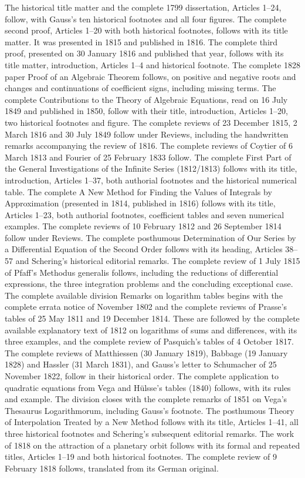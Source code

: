 The historical title matter and the complete 1799 dissertation, Articles 1–24, follow, with Gauss’s ten historical footnotes and all four figures. The complete second proof, Articles 1–20 with both historical footnotes, follows with its title matter. It was presented in 1815 and published in 1816. The complete third proof, presented on 30 January 1816 and published that year, follows with its title matter, introduction, Articles 1–4 and historical footnote. The complete 1828 paper Proof of an Algebraic Theorem follows, on positive and negative roots and changes and continuations of coefficient signs, including missing terms. The complete Contributions to the Theory of Algebraic Equations, read on 16 July 1849 and published in 1850, follow with their title, introduction, Articles 1–20, two historical footnotes and figure. The complete reviews of 23 December 1815, 2 March 1816 and 30 July 1849 follow under Reviews, including the handwritten remarks accompanying the review of 1816. The complete reviews of Coytier of 6 March 1813 and Fourier of 25 February 1833 follow. The complete First Part of the General Investigations of the Infinite Series (1812/1813) follows with its title, introduction, Articles 1–37, both authorial footnotes and the historical numerical table. The complete A New Method for Finding the Values of Integrals by Approximation (presented in 1814, published in 1816) follows with its title, Articles 1–23, both authorial footnotes, coefficient tables and seven numerical examples. The complete reviews of 10 February 1812 and 26 September 1814 follow under Reviews. The complete posthumous Determination of Our Series by a Differential Equation of the Second Order follows with its heading, Articles 38–57 and Schering’s historical editorial remarks. The complete review of 1 July 1815 of Pfaff’s Methodus generalis follows, including the reductions of differential expressions, the three integration problems and the concluding exceptional case. The complete available division Remarks on logarithm tables begins with the complete errata notice of November 1802 and the complete reviews of Prasse’s tables of 25 May 1811 and 19 December 1814. These are followed by the complete available explanatory text of 1812 on logarithms of sums and differences, with its three examples, and the complete review of Pasquich’s tables of 4 October 1817. The complete reviews of Matthiessen (30 January 1819), Babbage (19 January 1828) and Hassler (31 March 1831), and Gauss’s letter to Schumacher of 25 November 1822, follow in their historical order. The complete application to quadratic equations from Vega and Hülsse’s tables (1840) follows, with its rules and example. The division closes with the complete remarks of 1851 on Vega’s Thesaurus Logarithmorum, including Gauss’s footnote. The posthumous Theory of Interpolation Treated by a New Method follows with its title, Articles 1–41, all three historical footnotes and Schering’s subsequent editorial remarks. The work of 1818 on the attraction of a planetary orbit follows with its formal and repeated titles, Articles 1–19 and both historical footnotes. The complete review of 9 February 1818 follows, translated from its German original. 